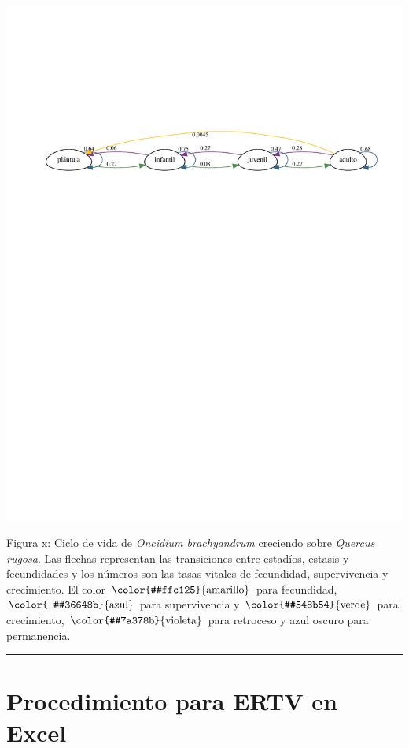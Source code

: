 \documentclass[
]{book}
\theoremstyle{definition}
\theoremstyle{definition}
\theoremstyle{definition}
\theoremstyle{definition}
\theoremstyle{remark}
\begin{document}
\includegraphics{Diagnostico_Poblacional_files/figure-latex/chap12_2_Quercus_rugosa-1.pdf}

Figura x: Ciclo de vida de \emph{Oncidium brachyandrum} creciendo sobre \emph{Quercus rugosa}. Las flechas representan las transiciones entre estadíos, estasis y fecundidades y los números son las tasas vitales de fecundidad, supervivencia y crecimiento. El color \(\color{#ffc125}{\text{amarillo}}\) para fecundidad, \(\color{  #36648b}{\text{azul}}\) para supervivencia y \(\color{#548b54}{\text{verde}}\) para crecimiento, \(\color{#7a378b}{\text{violeta}}\) para retroceso y azul oscuro para permanencia.

\begin{center}\rule{0.5\linewidth}{0.5pt}\end{center}

\section{Procedimiento para ERTV en Excel}\label{procedimiento-para-ertv-en-excel}
\end{document}
